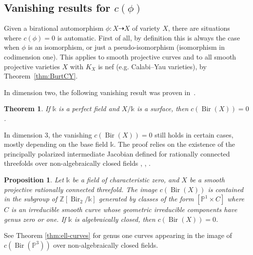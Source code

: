 \documentclass[a4paper,12pt]{amsart}
\def\k{\mathbb k}
\def\P{\mathbb P}
\def\Z{\mathbb Z}
\def\Bir{{\operatorname{Bir}}}
\theoremstyle{plain}
\newtheorem{theorem}[dummy]{Theorem}
\newtheorem{proposition}[dummy]{Proposition}
\numberwithin{equation}{section}
\theoremstyle{definition}
\renewcommand{\(}{\left(}
\renewcommand{\)}{\right)}
\newcommand{\dto}{\dashrightarrow}
\begin{document}
\subsection{Vanishing results for $c(\phi)$}
\hfill

Given a birational automorphism 
$\phi: X \dto X$ of variety $X$,
there are situations where $c(\phi) = 0$ is automatic.
First of all, by definition
this is always the case when $\phi$
is an isomorphism, or just a pseudo-isomorphism (isomorphism in codimension one).
This applies 
to smooth projective curves
and to all
smooth projective varieties $X$
with $K_X$ is nef (e.g. Calabi--Yau varieties),
by
Theorem~\ref{thm:BurtCY}.

In dimension two,
the following vanishing result was proven in~\cite{LSZ20}.

\begin{theorem}\cite[Theorem 3.4]{LSZ20}
\label{thm:surfaces-main}
If $\k$ is a perfect field and
$X/\k$ is a surface,
then $c(\Bir(X)) = 0$.
\end{theorem}

In dimension $3$,
the vanishing $c(\Bir(X)) = 0$ still holds in certain cases,
mostly depending on the base field $\k$.
The proof relies on the existence
of the principally
polarized intermediate Jacobian defined for
rationally connected threefolds over non-algebraically
closed
fields \cite{AchterCMVial}, \cite{AchterCMVial-2}, \cite{BenoistWittenbergPerf}.

\begin{proposition}\label{prop:ratconn3-fold}
Let $\k$ be a field of characteristic zero,
and $X$ be a smooth projective
rationally connected threefold.
The image $c(\Bir(X))$ is contained
in the subgroup of $\Z[\Bir_{2}/\k]$ generated
by classes of the form 
$[\P^1 \times C]$ where $C$ 
is an irreducible smooth curve
whose geometric
irreducible components have genus zero or one.
If $\k$ is algebraically closed, then 
$c(\Bir(X)) = 0$.
\end{proposition}

See Theorem \ref{thm:ell-curves} for genus one
curves appearing in the image of $c(\Bir(\P^3))$
over non-algebraically closed fields.
\end{document}
